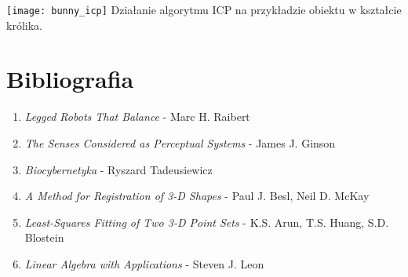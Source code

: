 \documentclass[12pt]{article}
\begin{document}
\texttt{[image: bunny\_icp]}
Działanie algorytmu ICP na przykładzie obiektu w kształcie królika.

\section{Bibliografia}
\begin{enumerate}
\item \emph{Legged Robots That Balance} - Marc H. Raibert
\item \emph{The Senses Considered as Perceptual Systems} - James J. Ginson
\item \emph{Biocybernetyka} - Ryszard Tadeusiewicz
\item \emph{A Method for Registration of 3-D Shapes} - Paul J. Besl, Neil D. McKay
\item \emph{Least-Squares Fitting of Two 3-D Point Sets} - K.S. Arun, T.S. Huang, S.D. Blostein
\item \emph{Linear Algebra with Applications} - Steven J. Leon
\end{enumerate}
\end{document}
